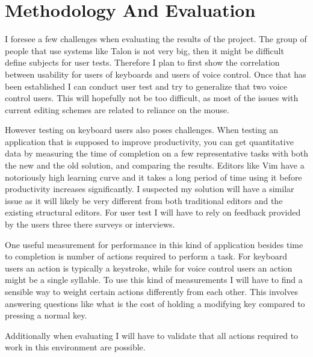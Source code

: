 \documentclass[a4paper,english]{ifimaster}
\begin{document}
\section{Methodology And Evaluation}
I foresee a few challenges when evaluating the results of the project.
The group of people that use systems like Talon is not very big, then it might be difficult define subjects
for user tests.
Therefore I plan to first show the correlation between usability for users of keyboards and users of voice control.
Once that has been established I can conduct user test and try to generalize that two voice control users.
This will hopefully not be too difficult, as most of the issues with current editing schemes are related to reliance on the mouse.

However testing on keyboard users also poses challenges.
When testing an application that is supposed to improve productivity, you can get quantitative data
by measuring the time of completion on a few representative tasks with both the new and the old solution, and comparing the results.
Editors like Vim have a notoriously high learning curve and it takes a long period of time using it before productivity increases significantly.
I suspected my solution will have a similar issue as it will likely be very different from both traditional editors
and the existing structural editors.
For user test I will have to rely on feedback provided by the users three there surveys or interviews.

One useful measurement for performance in this kind of application besides time to completion is number of actions required to perform a task.
For keyboard users an action is typically a keystroke, while for voice control users an action might be a single syllable.
To use this kind of measurements I will have to find a sensible way to weight certain actions differently from each other.
This involves answering questions like what is the cost of holding a modifying key compared to pressing a normal key.

Additionally when evaluating I will have to validate that all actions required to work in this environment are possible.





\backmatter{}
\printbibliography
\end{document}
